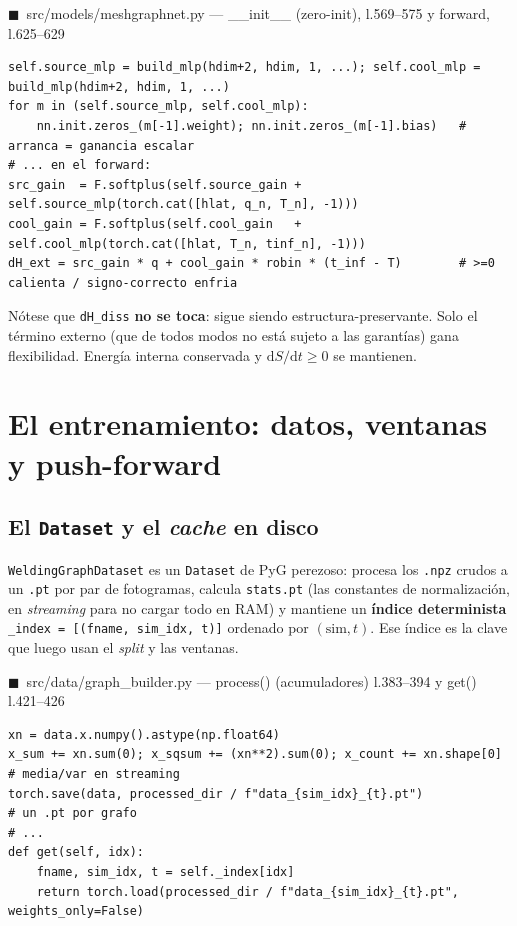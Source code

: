 \documentclass[11pt]{article}
\newcommand{\dd}{\mathrm{d}}
\theoremstyle{definition}
\theoremstyle{plain}
\newcommand{\srcref}[1]{\par\smallskip\noindent
  {\footnotesize\ttfamily\textcolor{srcblue}{$\blacksquare$\ #1}}\par\vspace{1pt}}
\begin{document}
\srcref{src/models/meshgraphnet.py — \_\_init\_\_ (zero-init), l.569--575 y forward, l.625--629}
\begin{lstlisting}
self.source_mlp = build_mlp(hdim+2, hdim, 1, ...); self.cool_mlp = build_mlp(hdim+2, hdim, 1, ...)
for m in (self.source_mlp, self.cool_mlp):
    nn.init.zeros_(m[-1].weight); nn.init.zeros_(m[-1].bias)   # arranca = ganancia escalar
# ... en el forward:
src_gain  = F.softplus(self.source_gain + self.source_mlp(torch.cat([hlat, q_n, T_n], -1)))
cool_gain = F.softplus(self.cool_gain   + self.cool_mlp(torch.cat([hlat, T_n, tinf_n], -1)))
dH_ext = src_gain * q + cool_gain * robin * (t_inf - T)        # >=0 calienta / signo-correcto enfria
\end{lstlisting}

Nótese que \texttt{dH\_diss} \textbf{no se toca}: sigue siendo estructura-preservante.
Solo el término externo (que de todos modos no está sujeto a las garantías) gana
flexibilidad. Energía interna conservada y $\dd S/\dd t\ge0$ se mantienen.

\section{El entrenamiento: datos, ventanas y push-forward}
\label{sec:train}

\subsection{El \texttt{Dataset} y el \emph{cache} en disco}

\texttt{WeldingGraphDataset} es un \texttt{Dataset} de PyG perezoso: procesa los
\texttt{.npz} crudos a un \texttt{.pt} por par de fotogramas, calcula
\texttt{stats.pt} (las constantes de normalización, en \emph{streaming} para no
cargar todo en RAM) y mantiene un \textbf{índice determinista}
\texttt{\_index = [(fname, sim\_idx, t)]} ordenado por $(\text{sim},t)$. Ese índice
es la clave que luego usan el \emph{split} y las ventanas.

\srcref{src/data/graph\_builder.py — process() (acumuladores) l.383--394 y get() l.421--426}
\begin{lstlisting}
xn = data.x.numpy().astype(np.float64)
x_sum += xn.sum(0); x_sqsum += (xn**2).sum(0); x_count += xn.shape[0]   # media/var en streaming
torch.save(data, processed_dir / f"data_{sim_idx}_{t}.pt")             # un .pt por grafo
# ...
def get(self, idx):
    fname, sim_idx, t = self._index[idx]
    return torch.load(processed_dir / f"data_{sim_idx}_{t}.pt", weights_only=False)
\end{lstlisting}
\end{document}
